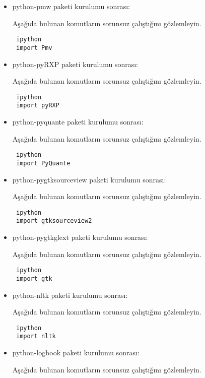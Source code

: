 \documentclass[a4paper,10pt]{article}
\begin{document}
\begin{itemize}
\item python-pmw paketi kurulumu sonrası:

Aşağıda bulunan komutların sorunsuz çalıştığını gözlemleyin.

\begin{verbatim}
 ipython
 import Pmv
\end{verbatim}

\item python-pyRXP paketi kurulumu sonrası:

Aşağıda bulunan komutların sorunsuz çalıştığını gözlemleyin.

\begin{verbatim}
 ipython
 import pyRXP
\end{verbatim}

\item python-pyquante paketi kurulumu sonrası:

Aşağıda bulunan komutların sorunsuz çalıştığını gözlemleyin.

\begin{verbatim}
 ipython
 import PyQuante
\end{verbatim}

\item python-pygtksourceview paketi kurulumu sonrası:

Aşağıda bulunan komutların sorunsuz çalıştığını gözlemleyin.

\begin{verbatim}
 ipython
 import gtksourceview2
\end{verbatim}

\item python-pygtkglext paketi kurulumu sonrası:

Aşağıda bulunan komutların sorunsuz çalıştığını gözlemleyin.

\begin{verbatim}
 ipython
 import gtk
\end{verbatim}

\item python-nltk paketi kurulumu sonrası:

Aşağıda bulunan komutların sorunsuz çalıştığını gözlemleyin.

\begin{verbatim}
 ipython
 import nltk
\end{verbatim}

\item python-logbook paketi kurulumu sonrası:

Aşağıda bulunan komutların sorunsuz çalıştığını gözlemleyin.


\end{itemize}
\end{document}
